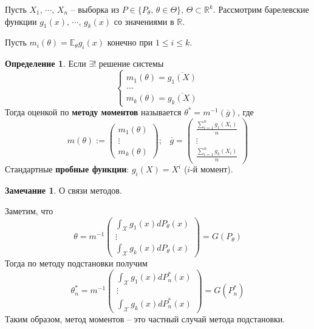\documentclass[a4paper,12pt]{article}
\renewcommand{\leq}{\ensuremath{\leqslant}}
\theoremstyle{plain}
\theoremstyle{definition}
\newtheorem{definition}{Определение}[section]
\newtheorem*{note}{Замечание}
\theoremstyle{remark}
\begin{document}
Пусть $X_1,\,\cdots,\,X_n$ -- выборка из $P \in \{P_\theta,\, \theta \in \Theta\},\, \Theta \subset \mathbb{R}^k$. Рассмотрим барелевские функции $g_1(x),\,\cdots,\,g_k(x)$ со значениями в $\mathbb{R}$.

Пусть $m_i(\theta) = \mathbb{E}_\theta g_i(x)$ конечно при $1 \leq i \leq k$. 

\begin{definition}
  Если $\exists!$ решение системы
  \[
    \begin{cases}
      m_1(\theta) = \overline{g_1(X)}\\
      \dots\\
      m_k(\theta) = \overline{g_k(X)}
    \end{cases}
  \]
  Тогда оценкой по \textbf{методу моментов} называется $\theta^* = m^{-1}(\overline{g})$, где
  \[
    m(\theta) := \begin{pmatrix}
      m_1(\theta)\\
      \vdots\\
      m_k(\theta)
    \end{pmatrix};\;\;\;
    \overline{g} = \begin{pmatrix}
      \frac{\sum_{i = 1}^n g_1(X_i)}{n}\\
      \vdots\\
      \frac{\sum_{i = 1}^n g_k(X_i)}{n}
    \end{pmatrix}
  \]
  Стандартные \textbf{пробные функции}: $g_i(X) = X^i$ ($i$-й момент).
\end{definition}

\begin{note}
  О связи методов.

  Заметим, что
  \[
    \theta = m^{-1}\begin{pmatrix}
      \int_\mathcal{X} g_1(x)dP_\theta(x)\\
      \vdots\\
      \int_\mathcal{X} g_k(x)dP_\theta(x)
    \end{pmatrix} = G(P_\theta)
  \]
  Тогда по методу подстановки получим
  \[
    \theta_n^* = m^{-1}\begin{pmatrix}
      \int_\mathcal{X} g_1(x)dP^*_n(x)\\
      \vdots\\
      \int_\mathcal{X} g_k(x)dP_n^*(x)
    \end{pmatrix} = G(P_n^*)
  \]
  Таким образом, метод моментов -- это частный случай метода подстановки.
\end{note}
\end{document}

